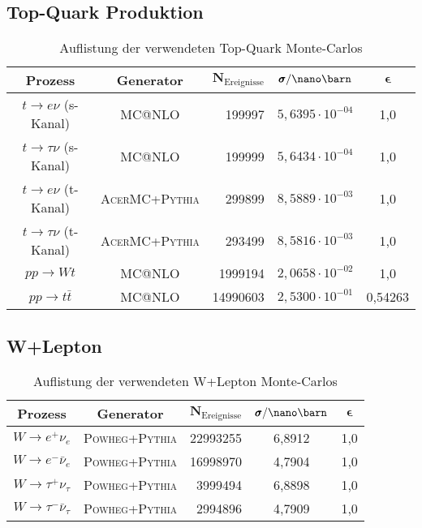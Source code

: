 \subsection*{Top-Quark Produktion} 
\begin{table}[h]
    \centering
    \begin{tabular}{|c|c|r|c|c|}
        \hline
        \bf{Prozess} & \bf{Generator} & $\pmb N_\text{Ereignisse}$ &
        $\pmb\sigma / \nano\barn$ & $\pmb\epsilon$ \\
        \hline \hline
        $t \rightarrow e\nu $ (s-Kanal)    & \textsc{MC@NLO       } & 199997   & $5,6395\cdot 10^{-04}$ & 1,0 \\
        $t \rightarrow \tau\nu $ (s-Kanal) & \textsc{MC@NLO       } & 199999   & $5,6434\cdot 10^{-04}$ & 1,0 \\
        $t \rightarrow e\nu $ (t-Kanal)    & \textsc{AcerMC+Pythia} & 299899   & $8,5889\cdot 10^{-03}$ & 1,0 \\
        $t \rightarrow \tau\nu $ (t-Kanal) & \textsc{AcerMC+Pythia} & 293499   & $8,5816\cdot 10^{-03}$ & 1,0 \\
        $pp \rightarrow Wt$                & \textsc{MC@NLO       } & 1999194  & $2,0658\cdot 10^{-02}$ & 1,0 \\
        $pp \rightarrow t \bar t$          & \textsc{MC@NLO       } & 14990603 & $2,5300\cdot 10^{-01}$ & 0,54263 \\
        \hline
    \end{tabular}
    \caption{Auflistung der verwendeten Top-Quark Monte-Carlos} 
\end{table}
\FloatBarrier

\newpage

\subsection*{W+Lepton} 
\begin{table}[h]
    \centering
    \begin{tabular}{|c|c|r|c|c|}
        \hline
        \bf{Prozess} & \bf{Generator} & $\pmb N_\text{Ereignisse}$ &
        $\pmb\sigma / \nano\barn$ & $\pmb\epsilon$ \\
        \hline \hline
        $W \rightarrow e^+\nu_e$       & \textsc{Powheg+Pythia} & 22993255 & 6,8912 & 1,0 \\
        $W \rightarrow e^-\bar\nu_e$   & \textsc{Powheg+Pythia} & 16998970 & 4,7904 & 1,0 \\
        $W \rightarrow \tau^+\nu_\tau$ & \textsc{Powheg+Pythia} & 3999494  & 6,8898 & 1,0 \\
        $W \rightarrow \tau^-\bar\nu_\tau$ & \textsc{Powheg+Pythia} & 2994896  & 4,7909 & 1,0 \\
        \hline
    \end{tabular}
    \caption{Auflistung der verwendeten W+Lepton Monte-Carlos} 
\end{table}
\FloatBarrier

